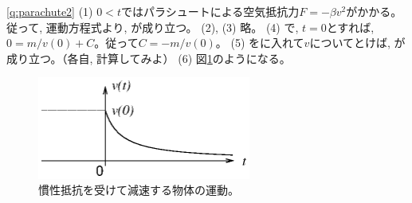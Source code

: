 \ref{q:parachute2}
(1) $0<t$ではパラシュートによる空気抵抗力$F=-\beta v^2$がかかる。従って, 運動方程式より, が成り立つ。
(2), (3) 略。
(4) で, $t=0$とすれば, $0=m/v(0)+C$。従って$C=-m/v(0)$。
(5) をに入れて$v$についてとけば, 
が成り立つ。（各自, 計算してみよ） 
(6) 図\ref{fig:inert_v}のようになる。
\begin{figure}[h]
    \centering
    \includegraphics[width=7cm]{inert_v.eps}
    \caption{慣性抵抗を受けて減速する物体の運動。}\label{fig:inert_v}
\end{figure}
\vspace{0.2cm}


